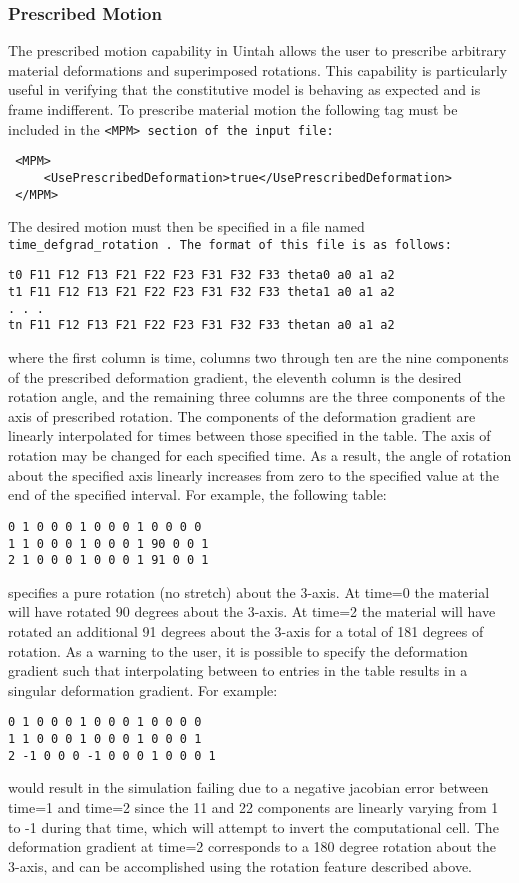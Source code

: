 \subsubsection{Prescribed Motion} \label{Sec:PrescribedMotion} The prescribed motion
capability in Uintah allows the user to prescribe arbitrary material
deformations and superimposed rotations.  This capability is particularly
useful in verifying that the constitutive model is behaving as expected and is
frame indifferent.  To prescribe material motion the following tag must be
included in the \tt <MPM> \normalfont section of the input file:

\begin{Verbatim}
 <MPM>
     <UsePrescribedDeformation>true</UsePrescribedDeformation>
 </MPM>
\end{Verbatim}

The desired motion must then be specified in a file named \tt time\_defgrad\_rotation \normalfont.  The format of this file is as follows:

\begin{Verbatim}
t0 F11 F12 F13 F21 F22 F23 F31 F32 F33 theta0 a0 a1 a2
t1 F11 F12 F13 F21 F22 F23 F31 F32 F33 theta1 a0 a1 a2
. . .
tn F11 F12 F13 F21 F22 F23 F31 F32 F33 thetan a0 a1 a2

\end{Verbatim}
where the first column is time, columns two through ten are the nine components of the prescribed deformation gradient, the eleventh column is the desired rotation angle, and the remaining three columns are the three components of the axis of prescribed rotation.  The components of the deformation gradient are linearly interpolated for times between those specified in the table.  The axis of rotation may be changed for each specified time.  As a result, the angle of rotation about the specified axis linearly increases from zero to the specified value at the end of the specified interval.  For example, the following table:

\begin{Verbatim}
0 1 0 0 0 1 0 0 0 1 0 0 0 0
1 1 0 0 0 1 0 0 0 1 90 0 0 1
2 1 0 0 0 1 0 0 0 1 91 0 0 1
\end{Verbatim}
specifies a pure rotation (no stretch) about the 3-axis.  At time=0 the material will have rotated 90 degrees about the 3-axis.  At time=2 the material will have rotated an additional 91 degrees about the 3-axis for a total of 181 degrees of rotation.  As a warning to the user, it is possible to specify the deformation gradient such that interpolating between to entries in the table results in a singular deformation gradient.  For example:
\begin{Verbatim}
0 1 0 0 0 1 0 0 0 1 0 0 0 0
1 1 0 0 0 1 0 0 0 1 0 0 0 1
2 -1 0 0 0 -1 0 0 0 1 0 0 0 1
\end{Verbatim}
would result in the simulation failing due to a negative jacobian error between time=1 and time=2 since the 11 and 22 components are linearly varying from 1 to -1 during that time, which will attempt to invert the computational cell.  The deformation gradient at time=2 corresponds to a 180 degree rotation about the 3-axis, and can be accomplished using the rotation feature described above.

